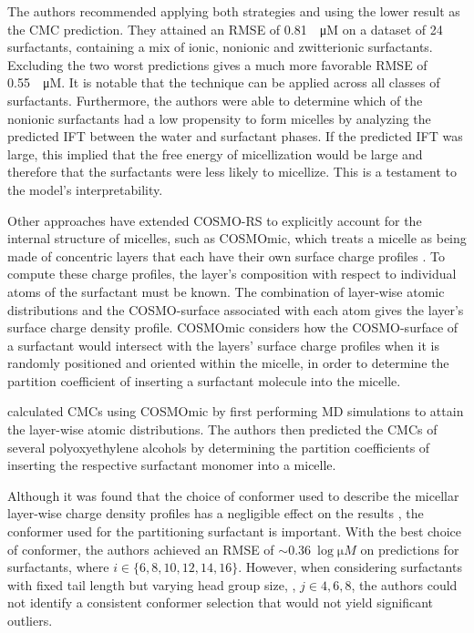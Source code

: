 The authors recommended applying both strategies and using the lower result as
the CMC prediction. They attained an RMSE of \SI{0.81}{\log \micro M} on a
dataset of 24 surfactants, containing a mix of ionic, nonionic and zwitterionic
surfactants. Excluding the two worst predictions gives a much more favorable
RMSE of \SI{0.55}{\log \micro M}. It is notable that the technique can be
applied across all classes of surfactants. Furthermore, the authors were able to
determine which of the nonionic surfactants had a low propensity to form
micelles by analyzing the predicted IFT between the water and surfactant phases.
If the predicted IFT was large, this implied that the free energy of
micellization would be large and therefore that the surfactants were less likely
to micellize. This is a testament to the model's interpretability.

Other approaches have extended COSMO-RS to explicitly account for the internal
structure of micelles, such as COSMOmic, which treats a micelle as being made of
concentric layers that each have their own surface charge profiles
\cite{klamtCOSMOmicMechanisticApproach2008}. To compute these charge profiles,
the layer's composition with respect to individual atoms of the surfactant must
be known. The combination of layer-wise atomic distributions and the
COSMO-surface associated with each atom gives the layer's surface charge density
profile. COSMOmic considers how the COSMO-surface of a surfactant would
intersect with the layers' surface charge profiles when it is randomly
positioned and oriented within the micelle, in order to determine the partition
coefficient of inserting a surfactant molecule into the micelle.

\citet{jakobtorweihenPredictingCriticalMicelle2017} calculated CMCs using
COSMOmic by first performing MD simulations to attain the layer-wise atomic
distributions. The authors then predicted the CMCs of several polyoxyethylene
alcohols by determining the partition coefficients of inserting the respective
surfactant monomer into a micelle.

Although it was found that the choice of conformer used to describe the micellar
layer-wise charge density profiles has a negligible effect on the results
\cite{jakobtorweihenCombinationCOSMOmicMolecular2013}, the conformer used for
the partitioning surfactant is important. With the best choice of conformer, the
authors achieved an RMSE of $\sim \SI{0.36}{\log \micro M}$ on predictions for
 surfactants, where $i \in \{6, 8, 10, 12, 14, 16\}$. However, when
considering surfactants with fixed tail length but varying head group size,
, $j \in {4, 6, 8}$, the authors could not identify a consistent
conformer selection that would not yield significant outliers.

